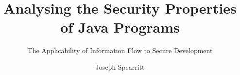 \usepackage{hyperref}
\usepackage[english]{babel}

\usepackage[parfill]{parskip}


\title[Thesis Progress Seminar]
{%
	Analysing the Security Properties\\of Java Programs		
}
\subtitle{The Applicability of Information Flow to Secure Development}
\author{Joseph Spearritt}
